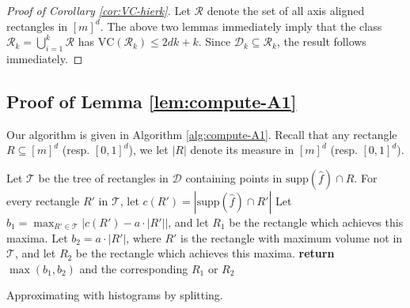 \documentclass[final,12pt]{colt2018} %
\newcommand{\supp}{\mathrm{supp}}
\newcommand{\rect}{\mathcal{R}}
\newcommand{\hier}{\mathcal{D}}
\newcommand{\calT}{\mathcal{T}}
\newcommand{\fhat}{\widehat{f}}
\newcommand{\VC}{\mathrm{VC}}
\begin{document}
\begin{proof}[Proof of Corollary \ref{cor:VC-hierk}]
Let $\rect$ denote the set of all axis aligned rectangles in $[m]^d$. 
The above two lemmas immediately imply that the class $\rect_k = \bigcup_{i = 1}^k \rect$ has $\VC (\rect_k) \leq 2 d k + k$.
Since $\hier_k \subseteq \rect_k$, the result follows immediately.
\end{proof}


\subsection{Proof of Lemma \ref{lem:compute-A1}}
Our algorithm is given in Algorithm \ref{alg:compute-A1}.
Recall that any rectangle $R \subseteq [m]^d$ (resp. $[0, 1]^d$), we let $|R|$ denote its measure  in $[m]^d$ (resp. $[0, 1]^d$).

\begin{algorithm*}[htb]
\begin{algorithmic}[1]
\Function{ComputeD1}{$\fhat, \hier, R, a$}
\State Let $\calT$ be the tree of rectangles in $\hier$ containing points in $\supp (\fhat) \cap R$.
\State For every rectangle $R'$ in $\calT$, let $c(R') = |\supp (\fhat) \cap R'|$ \label{line:1}
\State Let $b_1 = \max_{R' \in \calT} | c(R') - a \cdot |R'| |$, and let $R_1$ be the rectangle which achieves this maxima.
\State Let $b_2 = a \cdot |R'|$, where $R'$ is the rectangle with maximum volume not in $\calT$, and let $R_2$ be the rectangle which achieves this maxima. \label{line:2}
\State \textbf{return} $\max (b_1, b_2)$ and the corresponding $R_1$ or $R_2$
\EndFunction
\end{algorithmic}
\caption{Approximating with histograms by splitting.}
\label{alg:compute-A1}
\end{algorithm*}
\end{document}
